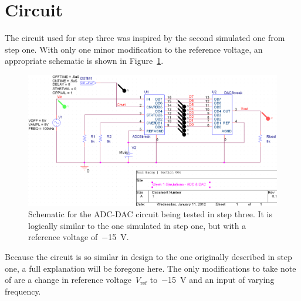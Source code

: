 \section{Circuit}

The circuit used for step three was inspired by the second simulated one from
step one.  With only one minor modification to the reference voltage, an
appropriate schematic is shown in Figure~\ref{f:schem}.
%
\begin{figure}[H]
\centering
	\includegraphics[width=.8\textwidth]{img/shot/schem.png}
	\parbox{.8\textwidth}{
	\caption[ADC-DAC Schematic]{Schematic for the ADC-DAC circuit being tested
	in step three.  It is logically similar to the one simulated in step one,
	but with a reference voltage of~\SI{-15}{\volt}.}
	\label{f:schem}}
\end{figure}
%
Because the circuit is so similar in design to the one originally described in
step one, a full explanation will be foregone here.  The only modifications to
take note of are a change in reference voltage~$V_\text{ref}$
to~\SI{-15}{\volt} and an input of varying frequency.
